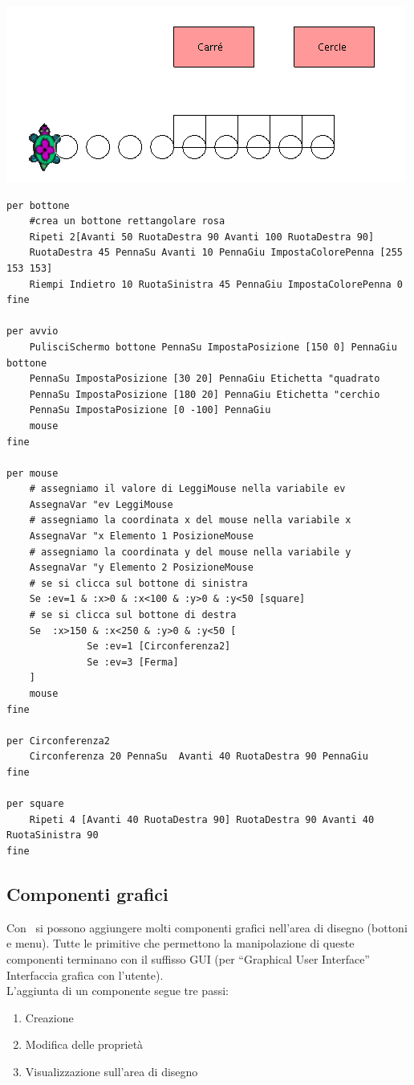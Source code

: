 \includegraphics*[width=15 cm]{pics/lissouris.png} 
\begin{lstlisting}[caption="Disegno di poligoni con il mouse"]
per bottone
	#crea un bottone rettangolare rosa 
	Ripeti 2[Avanti 50 RuotaDestra 90 Avanti 100 RuotaDestra 90] 
	RuotaDestra 45 PennaSu Avanti 10 PennaGiu ImpostaColorePenna [255 153 153]
	Riempi Indietro 10 RuotaSinistra 45 PennaGiu ImpostaColorePenna 0
fine

per avvio
	PulisciSchermo bottone PennaSu ImpostaPosizione [150 0] PennaGiu bottone
	PennaSu ImpostaPosizione [30 20] PennaGiu Etichetta "quadrato
	PennaSu ImpostaPosizione [180 20] PennaGiu Etichetta "cerchio
	PennaSu ImpostaPosizione [0 -100] PennaGiu
	mouse
fine

per mouse
	# assegniamo il valore di LeggiMouse nella variabile ev
	AssegnaVar "ev LeggiMouse
	# assegniamo la coordinata x del mouse nella variabile x
	AssegnaVar "x Elemento 1 PosizioneMouse
	# assegniamo la coordinata y del mouse nella variabile y
	AssegnaVar "y Elemento 2 PosizioneMouse
	# se si clicca sul bottone di sinistra
	Se :ev=1 & :x>0 & :x<100 & :y>0 & :y<50 [square]
	# se si clicca sul bottone di destra
	Se  :x>150 & :x<250 & :y>0 & :y<50 [
	          Se :ev=1 [Circonferenza2]
	          Se :ev=3 [Ferma]
	]
	mouse
fine

per Circonferenza2
	Circonferenza 20 PennaSu  Avanti 40 RuotaDestra 90 PennaGiu
fine

per square
	Ripeti 4 [Avanti 40 RuotaDestra 90] RuotaDestra 90 Avanti 40 RuotaSinistra 90
fine
\end{lstlisting} 


\subsection{Componenti grafici}
Con \xlogo\, si possono aggiungere molti componenti grafici nell'area di disegno (bottoni e menu). Tutte le primitive che permettono la manipolazione di queste componenti terminano con il suffisso \textsc{GUI} (per ``Graphical User Interface'' Interfaccia grafica con l'utente).\\
L'aggiunta di un componente segue tre passi:
\begin{enumerate}
	\item Creazione
	\item Modifica delle proprietà
	\item Visualizzazione sull'area di disegno
\end{enumerate}

